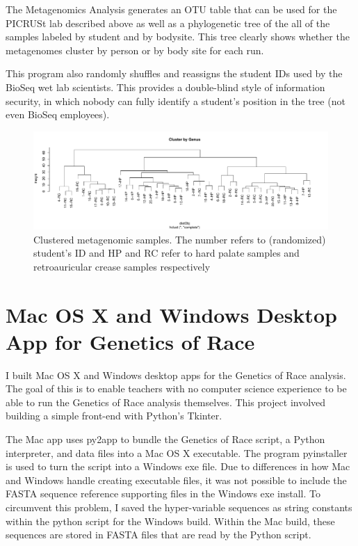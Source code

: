 \documentclass{report}
\begin{document}
The Metagenomics Analysis generates an OTU table that can be used for the PICRUSt lab described above as well as a phylogenetic tree of the all of the samples labeled by student and by bodysite. This tree clearly shows whether the metagenomes cluster by person or by body site for each run. 

This program also randomly shuffles and reassigns the student IDs used by the BioSeq wet lab scientists. This provides a double-blind style of information security, in which nobody can fully identify a student's position in the tree (not even BioSeq employees). 

\begin{figure}[h]
\includegraphics[width=\linewidth]{tree.pdf}
\caption{Clustered metagenomic samples. The number refers to (randomized) student's ID and HP and RC refer to hard palate samples and retroauricular crease samples respectively}
\end{figure}

\section{Mac OS X and Windows Desktop App for Genetics of Race}

I built Mac OS X and Windows desktop apps for the Genetics of Race analysis. The goal of this is to enable teachers with no computer science experience to be able to run the Genetics of Race analysis themselves. This project involved building a simple front-end with Python's Tkinter. 

The Mac app uses py2app to bundle the Genetics of Race script, a Python interpreter, and data files into a Mac OS X executable. The program pyinstaller is used to turn the script into a Windows exe file. Due to differences in how Mac and Windows handle creating executable files, it was not possible to include the FASTA sequence reference supporting files in the Windows exe install. To circumvent this problem, I saved the hyper-variable sequences as string constants within the python script for the Windows build. Within the Mac build, these sequences are stored in FASTA files that are read by the Python script. 
\end{document}
